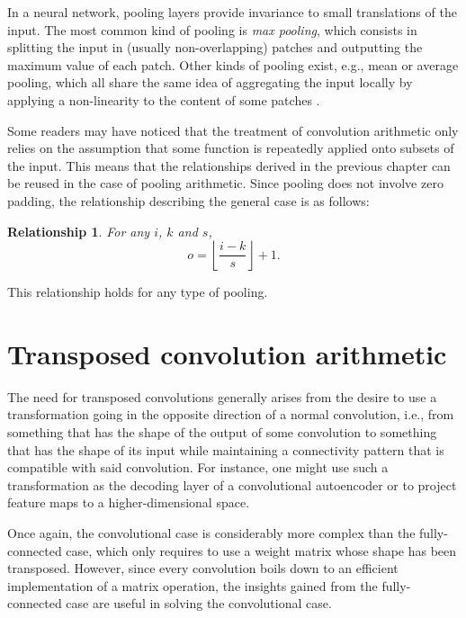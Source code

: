 \documentclass[notitlepage]{report}
\newtheorem{relationship}{Relationship}
\begin{document}
In a neural network, pooling layers provide invariance to small translations of
the input. The most common kind of pooling is \emph{max pooling}, which
consists in splitting the input in (usually non-overlapping) patches and
outputting the maximum value of each patch. Other kinds of pooling exist, e.g.,
mean or average pooling, which all share the same idea of aggregating the input
locally by applying a non-linearity to the content of some patches \citep{%
boureau-cvpr-10,boureau-icml-10,boureau-iccv-11,ICML2011Saxe_551}.

Some readers may have noticed that the treatment of convolution arithmetic only
relies on the assumption that some function is repeatedly applied onto subsets
of the input. This means that the relationships derived in the previous chapter
can be reused in the case of pooling arithmetic. Since pooling does not involve
zero padding, the relationship describing the general case is as follows:

\begin{relationship}\label{rel:pooling}
For any $i$, $k$ and $s$,
\begin{equation*}
    o = \left\lfloor \frac{i - k}{s} \right\rfloor + 1.
\end{equation*}
\end{relationship}

\noindent This relationship holds for any type of pooling.

\chapter{Transposed convolution arithmetic}

The need for transposed convolutions generally arises from the desire to use a
transformation going in the opposite direction of a normal convolution, i.e.,
from something that has the shape of the output of some convolution to
something that has the shape of its input while maintaining a connectivity
pattern that is compatible with said convolution. For instance, one might use
such a transformation as the decoding layer of a convolutional autoencoder or to
project feature maps to a higher-dimensional space.

Once again, the convolutional case is considerably more complex than the
fully-connected case, which only requires to use a weight matrix whose shape
has been transposed. However, since every convolution boils down to an
efficient implementation of a matrix operation, the insights gained from the
fully-connected case are useful in solving the convolutional case.
\end{document}
